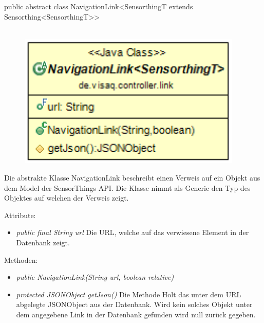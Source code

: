 public abstract class NavigationLink<SensorthingT extends Sensorthing<SensorthingT>>
\\\\
\begin{minipage}{0.3\textwidth}
    \begin{figure}[H]
        {\centering\includegraphics[width=0.95\textwidth]{media/backend/controller/classes/NavigationLink.png}}
    \end{figure}
    \end{minipage} \hfill
\begin{minipage}{0.7\textwidth}
    Die abstrakte Klasse NavigationLink beschreibt einen Verweis auf ein Objekt aus dem Model der \gls{SensorThings API}.
    Die Klasse nimmt als Generic den Typ des Objektes auf welchen der Verweis zeigt.
\end{minipage}

Attribute:
\begin{itemize}
    \item \emph{public final String url} Die URL, welche auf das verwiesene Element in der Datenbank zeigt.
\end{itemize}
Methoden:
\begin{itemize}
    \item \emph{public NavigationLink(String url, boolean relative)}
    \relativeDescription
    \item \emph{protected JSONObject getJson()} Die Methode Holt das unter dem URL abgelegte JSONObject aus der Datenbank.
    Wird kein solches Objekt unter dem angegebene Link in der Datenbank gefunden wird null zurück gegeben.
\end{itemize}

